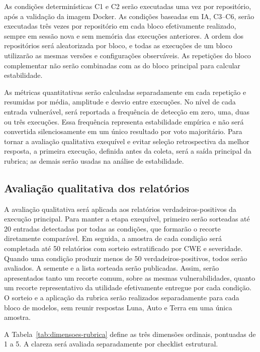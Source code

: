 As condições determinísticas C1 e C2 serão executadas uma vez por repositório, após a validação da imagem Docker. As condições baseadas em IA, C3--C6, serão executadas três vezes por repositório em cada bloco efetivamente realizado, sempre em sessão nova e sem memória das execuções anteriores. A ordem dos repositórios será aleatorizada por bloco, e todas as execuções de um bloco utilizarão as mesmas versões e configurações observáveis. As repetições do bloco complementar não serão combinadas com as do bloco principal para calcular estabilidade.

As métricas quantitativas serão calculadas separadamente em cada repetição e resumidas por média, amplitude e desvio entre execuções. No nível de cada entrada vulnerável, será reportada a frequência de detecção em zero, uma, duas ou três execuções. Essa frequência representa estabilidade empírica e não será convertida silenciosamente em um único resultado por voto majoritário. Para tornar a avaliação qualitativa exequível e evitar seleção retrospectiva da melhor resposta, a primeira execução, definida antes da coleta, será a saída principal da rubrica; as demais serão usadas na análise de estabilidade.

\subsection{Avaliação qualitativa dos relatórios}\label{subsec:metricas-qualitativas-metodologia}

A avaliação qualitativa será aplicada aos relatórios verdadeiros-positivos da execução principal. Para manter a etapa exequível, primeiro serão sorteadas até 20 entradas detectadas por todas as condições, que formarão o recorte diretamente comparável. Em seguida, a amostra de cada condição será completada até 50 relatórios com sorteio estratificado por CWE e severidade. Quando uma condição produzir menos de 50 verdadeiros-positivos, todos serão avaliados. A semente e a lista sorteada serão publicadas. Assim, serão apresentados tanto um recorte comum, sobre as mesmas vulnerabilidades, quanto um recorte representativo da utilidade efetivamente entregue por cada condição. O sorteio e a aplicação da rubrica serão realizados separadamente para cada bloco de modelos, sem reunir respostas Luna, Auto e Terra em uma única amostra.

A Tabela~\ref{tab:dimensoes-rubrica} define as três dimensões ordinais, pontuadas de 1 a 5. A clareza será avaliada separadamente por checklist estrutural.

